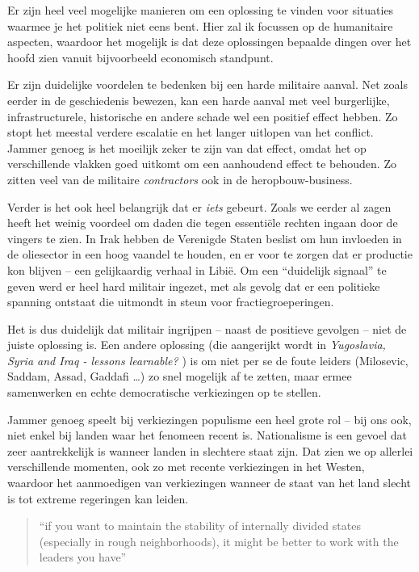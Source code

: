 \documentclass[a4paper]{article}
\begin{document}
Er zijn heel veel mogelijke manieren om een oplossing te vinden voor situaties waarmee je het politiek niet eens bent. Hier zal ik focussen op de humanitaire aspecten, waardoor het mogelijk is dat deze oplossingen bepaalde dingen over het hoofd zien vanuit bijvoorbeeld economisch standpunt.

Er zijn duidelijke voordelen te bedenken bij een harde militaire aanval. Net zoals eerder in de geschiedenis bewezen, kan een harde aanval met veel burgerlijke, infrastructurele, historische en andere schade wel een positief effect hebben. Zo stopt het meestal verdere escalatie en het langer uitlopen van het conflict. Jammer genoeg is het moeilijk zeker te zijn van dat effect, omdat het op verschillende vlakken goed uitkomt om een aanhoudend effect te behouden. Zo zitten veel van de militaire \emph{contractors} ook in de heropbouw-business.

Verder is het ook heel belangrijk dat er \emph{iets} gebeurt. Zoals we eerder al zagen heeft het weinig voordeel om daden die tegen essentiële rechten ingaan door de vingers te zien. In Irak hebben de Verenigde Staten beslist om hun invloeden in de oliesector in een hoog vaandel te houden, en er voor te zorgen dat er productie kon blijven -- een gelijkaardig verhaal in Libië. Om een ``duidelijk signaal'' te geven werd er heel hard militair ingezet, met als gevolg dat er een politieke spanning ontstaat die uitmondt in steun voor fractiegroeperingen.

Het is dus duidelijk dat militair ingrijpen -- naast de positieve gevolgen -- niet de juiste oplossing is. Een andere oplossing (die aangerijkt wordt in \emph{Yugoslavia, Syria and Iraq - lessons learnable?} \cite{transconflict}) is om niet per se de foute leiders (Milosevic, Saddam, Assad, Gaddafi \dots) zo snel mogelijk af te zetten, maar ermee samenwerken en echte democratische verkiezingen op te stellen.

Jammer genoeg speelt bij verkiezingen populisme een heel grote rol -- bij ons ook, niet enkel bij landen waar het fenomeen recent is. Nationalisme is een gevoel dat zeer aantrekkelijk is wanneer landen in slechtere staat zijn. Dat zien we op allerlei verschillende momenten, ook zo met recente verkiezingen in het Westen, waardoor het aanmoedigen van verkiezingen wanneer de staat van het land slecht is tot extreme regeringen kan leiden.

\begin{quote}
  ``if you want to maintain the stability of internally divided states (especially in rough neighborhoods), it might be better to work with the leaders you have'' \cite{transconflict}
\end{quote}
\end{document}

